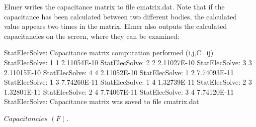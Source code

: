 \begin{flushleft}

Elmer writes the capacitance matrix to file cmatrix.dat.
Note that if the capacitance has been calculated between two different bodies, the calculated value appears two times in the matrix.
Elmer also outputs the calculated capacitancies on the screen, where they can be examined:

\begin{center}
\ttbegin
StatElecSolve: Capacitance matrix computation performed (i,j,C_ij)
StatElecSolve:   1  1    2.11054E-10
StatElecSolve:   2  2    2.11027E-10
StatElecSolve:   3  3    2.11015E-10
StatElecSolve:   4  4    2.11052E-10
StatElecSolve:   1  2    7.74093E-11
StatElecSolve:   1  3    7.74260E-11
StatElecSolve:   1  4    1.32739E-11
StatElecSolve:   2  3    1.32801E-11
StatElecSolve:   2  4    7.74067E-11
StatElecSolve:   3  4    7.74120E-11
StatElecSolve: Capacitance matrix was saved to file cmatrix.dat
\ttend 

$Capacitancies$ $(F)$.
\end{center}


\end{flushleft}




























